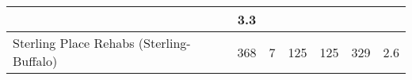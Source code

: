 {\begin{tabular}{l|c|c|c|c|c|c|}
     & 3.3                                                                \\ \hline\multicolumn{1}{|l|}{\cellcolor{ccteallight}Sterling Place Rehabs (Sterling-Buffalo)}        & 368                                                   & 7                            & 125                                                   & 125                                                           & 329                                                                & 2.6                                                                \\ \hline
    \end{tabular}
    }
    